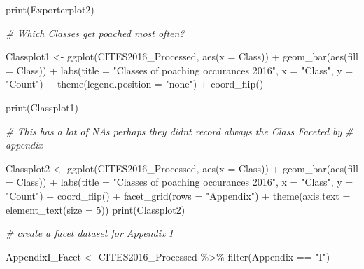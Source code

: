 \documentclass[
  12pt,
]{article}
\newenvironment{Shaded}{\begin{snugshade}}{\end{snugshade}}
\newcommand{\AttributeTok}[1]{\textcolor[rgb]{0.77,0.63,0.00}{#1}}
\newcommand{\CommentTok}[1]{\textcolor[rgb]{0.56,0.35,0.01}{\textit{#1}}}
\newcommand{\DecValTok}[1]{\textcolor[rgb]{0.00,0.00,0.81}{#1}}
\newcommand{\FunctionTok}[1]{\textcolor[rgb]{0.00,0.00,0.00}{#1}}
\newcommand{\NormalTok}[1]{#1}
\newcommand{\OtherTok}[1]{\textcolor[rgb]{0.56,0.35,0.01}{#1}}
\newcommand{\SpecialCharTok}[1]{\textcolor[rgb]{0.00,0.00,0.00}{#1}}
\newcommand{\StringTok}[1]{\textcolor[rgb]{0.31,0.60,0.02}{#1}}
\begin{document}
\begin{Shaded}
\begin{Highlighting}[]
\FunctionTok{print}\NormalTok{(Exporterplot2)}

\CommentTok{\# Which Classes get poached most often?}

\NormalTok{Classplot1 }\OtherTok{\textless{}{-}} \FunctionTok{ggplot}\NormalTok{(CITES2016\_Processed, }\FunctionTok{aes}\NormalTok{(}\AttributeTok{x =}\NormalTok{ Class)) }\SpecialCharTok{+} \FunctionTok{geom\_bar}\NormalTok{(}\FunctionTok{aes}\NormalTok{(}\AttributeTok{fill =}\NormalTok{ Class)) }\SpecialCharTok{+}
    \FunctionTok{labs}\NormalTok{(}\AttributeTok{title =} \StringTok{"Classes of poaching occurances 2016"}\NormalTok{, }\AttributeTok{x =} \StringTok{"Class"}\NormalTok{, }\AttributeTok{y =} \StringTok{"Count"}\NormalTok{) }\SpecialCharTok{+}
    \FunctionTok{theme}\NormalTok{(}\AttributeTok{legend.position =} \StringTok{"none"}\NormalTok{) }\SpecialCharTok{+} \FunctionTok{coord\_flip}\NormalTok{()}

\FunctionTok{print}\NormalTok{(Classplot1)}


\CommentTok{\# This has a lot of NAs perhaps they didn\textquotesingle{}t record always the Class Faceted by}
\CommentTok{\# appendix}

\NormalTok{Classplot2 }\OtherTok{\textless{}{-}} \FunctionTok{ggplot}\NormalTok{(CITES2016\_Processed, }\FunctionTok{aes}\NormalTok{(}\AttributeTok{x =}\NormalTok{ Class)) }\SpecialCharTok{+} \FunctionTok{geom\_bar}\NormalTok{(}\FunctionTok{aes}\NormalTok{(}\AttributeTok{fill =}\NormalTok{ Class)) }\SpecialCharTok{+}
    \FunctionTok{labs}\NormalTok{(}\AttributeTok{title =} \StringTok{"Classes of poaching occurances 2016"}\NormalTok{, }\AttributeTok{x =} \StringTok{"Class"}\NormalTok{, }\AttributeTok{y =} \StringTok{"Count"}\NormalTok{) }\SpecialCharTok{+}
    \FunctionTok{coord\_flip}\NormalTok{() }\SpecialCharTok{+} \FunctionTok{facet\_grid}\NormalTok{(}\AttributeTok{rows =} \StringTok{"Appendix"}\NormalTok{) }\SpecialCharTok{+} \FunctionTok{theme}\NormalTok{(}\AttributeTok{axis.text =} \FunctionTok{element\_text}\NormalTok{(}\AttributeTok{size =} \DecValTok{5}\NormalTok{))}
\FunctionTok{print}\NormalTok{(Classplot2)}

\CommentTok{\# create a facet dataset for Appendix I}

\NormalTok{AppendixI\_Facet }\OtherTok{\textless{}{-}}\NormalTok{ CITES2016\_Processed }\SpecialCharTok{\%\textgreater{}\%}
    \FunctionTok{filter}\NormalTok{(Appendix }\SpecialCharTok{==} \StringTok{"I"}\NormalTok{)}



\end{Highlighting}
\end{Shaded}
\end{document}

